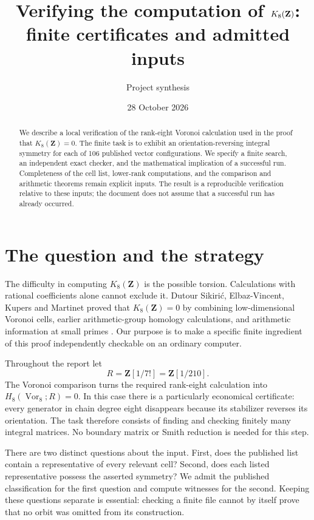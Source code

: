 \documentclass[11pt,a4paper]{article}
\title{\vspace{-1.2em}Verifying the computation of \(K_8(\Z)\):\\
finite certificates and admitted inputs}
\author{Project synthesis}
\date{28 October 2026}
\numberwithin{equation}{section}
\theoremstyle{definition}
\theoremstyle{remark}
\newcommand{\Z}{\mathbf Z}
\newcommand{\Vor}{\operatorname{Vor}}
\begin{document}
\maketitle
\vspace{-1.3em}
\begin{abstract}
We describe a local verification of the rank-eight Voronoi calculation
used in the proof that \(K_8(\Z)=0\).
The finite task is to exhibit an orientation-reversing integral symmetry
for each of 106 published vector configurations.
We specify a finite search, an independent exact checker, and the
mathematical implication of a successful run.
Completeness of the cell list, lower-rank computations, and the
comparison and arithmetic theorems remain explicit inputs.
The result is a reproducible verification relative to these inputs;
the document does not assume that a successful run has already occurred.
\end{abstract}

\section{The question and the strategy}\label{sec:intro}

The difficulty in computing \(K_8(\Z)\) is the possible torsion.
Calculations with rational coefficients alone cannot exclude it.
Dutour Sikirić, Elbaz-Vincent, Kupers and Martinet proved that
\(K_8(\Z)=0\) by combining low-dimensional Voronoi cells,
earlier arithmetic-group homology calculations, and arithmetic
information at small primes \cite[Theorem~6.4]{DEKM}.
Our purpose is to make a specific finite ingredient of this proof
independently checkable on an ordinary computer.

Throughout the report let
\[
 R=\Z[1/7!]=\Z[1/210].
\]
The Voronoi comparison turns the required rank-eight calculation into
\(H_8(\Vor_8;R)=0\). In this case there is a particularly economical
certificate: every generator in chain degree eight disappears because
its stabilizer reverses its orientation. The task therefore consists
of finding and checking finitely many integral matrices. No boundary
matrix or Smith reduction is needed for this step.

There are two distinct questions about the input. First, does the
published list contain a representative of every relevant cell?
Second, does each listed representative possess the asserted symmetry?
We admit the published classification for the first question and
compute witnesses for the second. Keeping these questions separate
is essential: checking a finite file cannot by itself prove that
no orbit was omitted from its construction.
\end{document}
